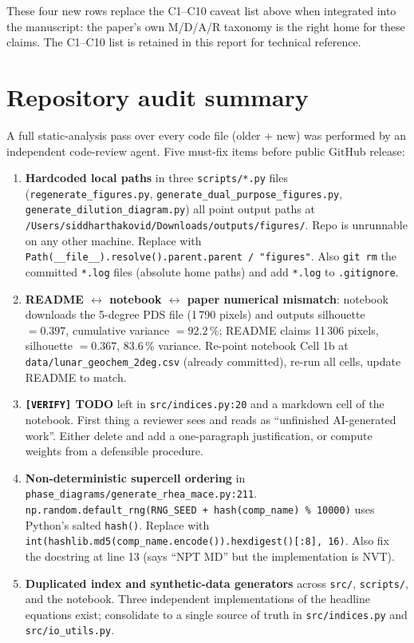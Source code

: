 \documentclass[11pt,a4paper]{article}
\begin{document}
These four new rows replace the C1--C10 caveat list above when integrated
into the manuscript: the paper's own M/D/A/R taxonomy is the right home for
these claims. The C1--C10 list is retained in this report for technical
reference.

\section{Repository audit summary}
\label{sec:audit}

A full static-analysis pass over every code file (older + new) was performed
by an independent code-review agent. Five must-fix items before public
GitHub release:

{\sloppy
\begin{enumerate}[(1)]
  \item \textbf{Hardcoded local paths} in three \texttt{scripts/*.py} files
        (\texttt{regenerate\_figures.py}, \texttt{generate\_dual\_purpose\_figures.py},
        \texttt{generate\_dilution\_diagram.py}) all point output paths at
        \texttt{/Users/siddharthakovid/Downloads/outputs/figures/}. Repo is
        unrunnable on any other machine. Replace with
        \texttt{Path(\_\_file\_\_).resolve().parent.parent\,/\,"figures"}.
        Also \texttt{git rm} the committed \texttt{*.log} files (absolute
        home paths) and add \texttt{*.log} to \texttt{.gitignore}.
  \item \textbf{README $\leftrightarrow$ notebook $\leftrightarrow$ paper
        numerical mismatch}: notebook downloads the 5-degree PDS file
        (1\,790 pixels) and outputs silhouette $= 0.397$, cumulative variance
        $= 92.2$\,\%; README claims 11\,306 pixels, silhouette $= 0.367$,
        $83.6$\,\% variance. Re-point notebook Cell 1b at
        \texttt{data/lunar\_geochem\_2deg.csv} (already committed), re-run
        all cells, update README to match.
  \item \textbf{\texttt{[VERIFY]} TODO} left in \texttt{src/indices.py:20}
        and a markdown cell of the notebook. First thing a reviewer sees and
        reads as ``unfinished AI-generated work''. Either delete and add a
        one-paragraph justification, or compute weights from a defensible
        procedure.
  \item \textbf{Non-deterministic supercell ordering} in
        \texttt{phase\_diagrams/generate\_rhea\_mace.py:211}.
        \texttt{np.random.default\_rng(RNG\_SEED + hash(comp\_name) \% 10000)}
        uses Python's salted \texttt{hash()}. Replace with
        \texttt{int(hashlib.md5(comp\_name.encode()).hexdigest()[:8], 16)}.
        Also fix the docstring at line 13 (says ``NPT MD'' but the implementation
        is NVT).
  \item \textbf{Duplicated index and synthetic-data generators} across
        \texttt{src/}, \texttt{scripts/}, and the notebook. Three independent
        implementations of the headline equations exist; consolidate to a
        single source of truth in \texttt{src/indices.py} and
        \texttt{src/io\_utils.py}.
\end{enumerate}
\par}
\end{document}
